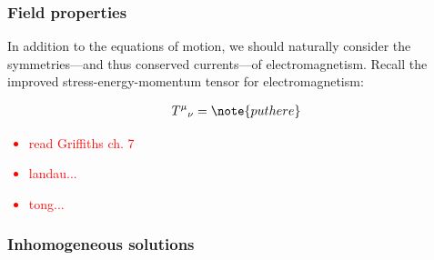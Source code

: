 \documentclass[11pt]{article}
\begin{document}
\subsubsection{Field properties}

In addition to the equations of motion, we should naturally consider
the symmetries---and thus conserved currents---of electromagnetism.
Recall the improved stress-energy-momentum tensor for electromagnetism:

\begin{align*}
    T^\mu{}_\nu = \note{put here}
\end{align*}


\textcolor{red}{
    \begin{itemize}
        \item read Griffiths ch. 7
        \item landau...
        \item tong...
    \end{itemize}
}

\subsubsection{Inhomogeneous solutions}
\end{document}

